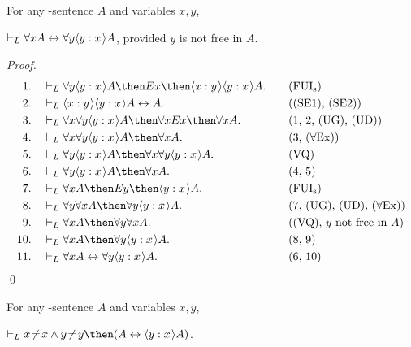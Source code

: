 \documentclass[11pt]{woarticle}
\theoremstyle{break}
\theoremstyle{nonumberplain}
\newcommand{\1}{\;\,|\;\,}
\renewcommand{\t}[1]{\ensuremath{\langle #1  \makebox[.2ex]{}\rangle}}
\newcommand{\T}[1]{\ensuremath{(\mathrm{ #1})}}
\newcommand{\itemT}[1]{\item[\T{#1}]}
\begin{document}
\begin{lemma}
  For any -sentence $A$ and variables $x,y$,
  \begin{semantics}
    \itemT{SBV} $\vdash_L \forall x A \leftrightarrow \forall y \t{y:x}A$,
    provided $y$ is not free in $A$.
  \end{semantics}
\end{lemma}
\begin{proof}
  \begin{alignat*}{2}
  1.\quad& \vdash_L \forall y\t{y:x}A \then Ex \then \t{x:y}\t{y:x}A. &\quad&\text{\T{FUI_s}}\\
  2.\quad& \vdash_L \t{x:y}\t{y:x}A \leftrightarrow A. &&\text{(\T{SE1}, \T{SE2})}\\
  3.\quad& \vdash_L \forall x\forall y \t{y:x}A \then \forall x Ex \then \forall x A.
    &&\text{(1, 2, \T{UG}, \T{UD})}\\
  4.\quad& \vdash_L \forall x\forall y \t{y:x}A \then \forall x A.
    &&\text{(3, \T{\forall Ex})}\\
  5.\quad& \vdash_L \forall y\t{y:x}A \then \forall x \forall y \t{y:x}A. &&\text{\T{VQ}}\\
  6.\quad& \vdash_L \forall y\t{y:x}A \then \forall x A. &&\text{(4, 5)}\\
  7.\quad& \vdash_L \forall x A \then Ey \then \t{y:x}A. &&\text{\T{FUI_s}}\\
  8.\quad& \vdash_L \forall y\forall x A \then \forall y \t{y:x}A.
    &&\text{(7, \T{UG}, \T{UD}, \T{\forall Ex})}\\
  9.\quad& \vdash_L \forall x A \then \forall y \forall x A. 
    &&\text{(\T{VQ}, $y$ not free in $A$)}\\
  10.\quad& \vdash_L \forall x A \then \forall y \t{y:x}A. &&\text{(8, 9)}\\
  11.\quad& \vdash_L \forall x A \leftrightarrow \forall y \t{y:x}A. &&\text{(6, 10)}
  \end{alignat*}
  \qed
\end{proof}
 
\begin{lemma}
  For any -sentence $A$ and variables $x,y$,
  \begin{semantics}
    \itemT{SEV} $\vdash_L x\!\not=\!x \land y\!\not=\!y 
                   \then (A \leftrightarrow \t{y:x}A)$.
  \end{semantics}
\end{lemma}
\end{document}
